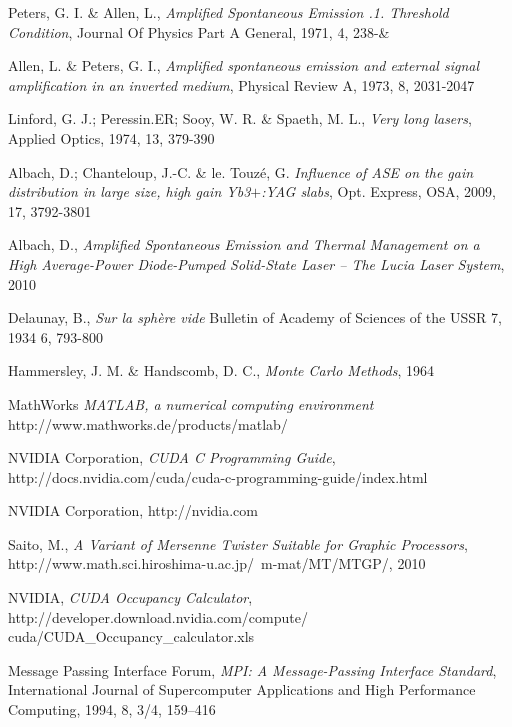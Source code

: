 \begin{thebibliography}{9}

    Peters, G. I. \& Allen, L., 
    \emph{Amplified Spontaneous Emission .1. Threshold Condition},
    Journal Of Physics Part A General, 
    1971, 
    4, 
    238-\&

    Allen, L. \& Peters, G. I.,
    \emph{Amplified spontaneous emission and external signal amplification in an inverted medium},
    Physical Review A, 
    1973, 
    8, 
    2031-2047

    Linford, G. J.; Peressin.ER; Sooy, W. R. \& Spaeth, M. L.,
    \emph{Very long lasers},
    Applied Optics, 
    1974, 
    13, 
    379-390

    Albach, D.; Chanteloup, J.-C. \& le. Touzé, G. 
    \emph{Influence of ASE on the gain distribution in large size, high gain Yb3$+$:YAG slabs},
    Opt. Express,
    OSA,
    2009, 
    17,
    3792-3801

    Albach, D.,
    \emph{Amplified Spontaneous Emission and Thermal Management on a High Average-Power Diode-Pumped Solid-State Laser \--- The Lucia Laser System},
    2010

    Delaunay, B.,
    \emph{Sur la sphère vide}
    Bulletin of Academy of Sciences of the USSR 7,
    1934
    6,
    793-800

    Hammersley, J. M. \& Handscomb, D. C.,
    \emph{Monte Carlo Methods},
    1964

    MathWorks
    \emph{MATLAB, a numerical computing environment}
    http://www.mathworks.de/products/matlab/

    NVIDIA Corporation,
    \emph{CUDA C Programming Guide},
    http://docs.nvidia.com/cuda/cuda-c-programming-guide/index.html

    NVIDIA Corporation,
    http://nvidia.com

    Saito, M.,
    \emph{A Variant of Mersenne Twister Suitable for Graphic Processors},
    http://www.math.sci.hiroshima-u.ac.jp/~m-mat/MT/MTGP/,
    2010

    NVIDIA,
    \emph{CUDA Occupancy Calculator},
    http://developer.download.nvidia.com/compute/ cuda/CUDA\_Occupancy\_calculator.xls

    Message Passing Interface Forum,
    \emph{MPI: A Message-Passing Interface Standard}, 
    International Journal of Supercomputer Applications and High Performance Computing,
    1994,
    8, 3/4, 159–416


\end{thebibliography}
